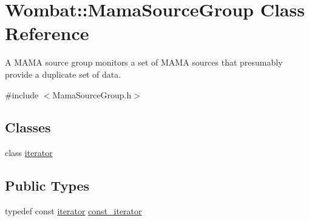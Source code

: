 \hypertarget{classWombat_1_1MamaSourceGroup}{
\section{Wombat::MamaSourceGroup Class Reference}
\label{classWombat_1_1MamaSourceGroup}
}


A MAMA source group monitors a set of MAMA sources that presumably provide a duplicate set of data.  


{\ttfamily \#include $<$MamaSourceGroup.h$>$}\subsection*{Classes}
\begin{DoxyCompactItemize}
\item 
class \hyperlink{classWombat_1_1MamaSourceGroup_1_1iterator}{iterator}
\end{DoxyCompactItemize}
\subsection*{Public Types}
\begin{DoxyCompactItemize}
\item 
typedef const \hyperlink{classWombat_1_1MamaSourceGroup_1_1iterator}{iterator} \hyperlink{classWombat_1_1MamaSourceGroup_a65cb4cd84b8161cb0848a4cb28e53311}{const\_\-iterator}
\end{DoxyCompactItemize}
